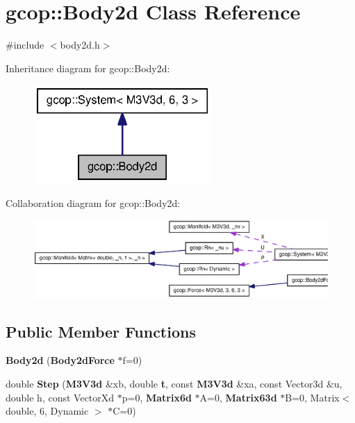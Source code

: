 \section{gcop\-:\-:\-Body2d \-Class \-Reference}
\label{classgcop_1_1Body2d}


{\ttfamily \#include $<$body2d.\-h$>$}



\-Inheritance diagram for gcop\-:\-:\-Body2d\-:\nopagebreak
\begin{figure}[H]
\begin{center}
\leavevmode
\includegraphics[width=192pt]{classgcop_1_1Body2d__inherit__graph}
\end{center}
\end{figure}


\-Collaboration diagram for gcop\-:\-:\-Body2d\-:\nopagebreak
\begin{figure}[H]
\begin{center}
\leavevmode
\includegraphics[width=350pt]{classgcop_1_1Body2d__coll__graph}
\end{center}
\end{figure}
\subsection*{\-Public \-Member \-Functions}
\begin{DoxyCompactItemize}
\item 
{\bf \-Body2d} ({\bf \-Body2d\-Force} $\ast$f=0)
\item 
double {\bf \-Step} ({\bf \-M3\-V3d} \&xb, double {\bf t}, const {\bf \-M3\-V3d} \&xa, const \-Vector3d \&u, double h, const \-Vector\-Xd $\ast$p=0, {\bf \-Matrix6d} $\ast$\-A=0, {\bf \-Matrix63d} $\ast$\-B=0, \-Matrix$<$ double, 6, \-Dynamic $>$ $\ast$\-C=0)
\end{DoxyCompactItemize}
